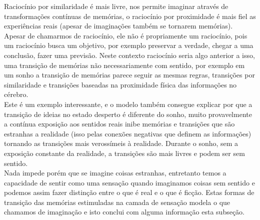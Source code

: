 \documentclass[10pt,a4paper]{report}
\begin{document}
Raciocínio por similaridade é mais livre, nos permite imaginar através de transformações contínuas de memórias, o raciocínio por proximidade é mais fiel as experiências reais (apesar de imaginações também se tornarem memórias).\\

Apesar de chamarmos de raciocínio, ele não é propriamente um raciocínio, pois um raciocínio busca um objetivo, por exemplo preservar a verdade, chegar a uma conclusão, fazer uma previsão. Neste contexto raciocínio seria algo anterior a isso, uma transição de memórias não necessariamente com sentido, por exemplo em um sonho a transição de memórias parece seguir as mesmas regras, transições por similaridade e transições baseadas na proximidade física das informações no cérebro.\\

Este é um exemplo interessante, e o modelo também consegue explicar por que a transição de ideias no estado desperto é diferente do sonho, muito provavelmente a contínua exposição aos sentidos reais inibe memórias e transições que são estranhas a realidade (isso pelas conexões negativas que definem as informações) tornando as transições mais verossímeis à realidade. Durante o sonho, sem a exposição constante da realidade, a transições são mais livres e podem ser sem sentido.\\

Nada impede porém que se imagine coisas estranhas, entretanto temos a capacidade de sentir como uma sensação quando imaginamos coisas sem sentido e podemos assim fazer distinção entre o que é real e o que é ficção. Estas formas de transição das memórias estimuladas na camada de sensação modela o que chamamos de imaginação e isto conclui com alguma informação esta subseção.


\end{document}

